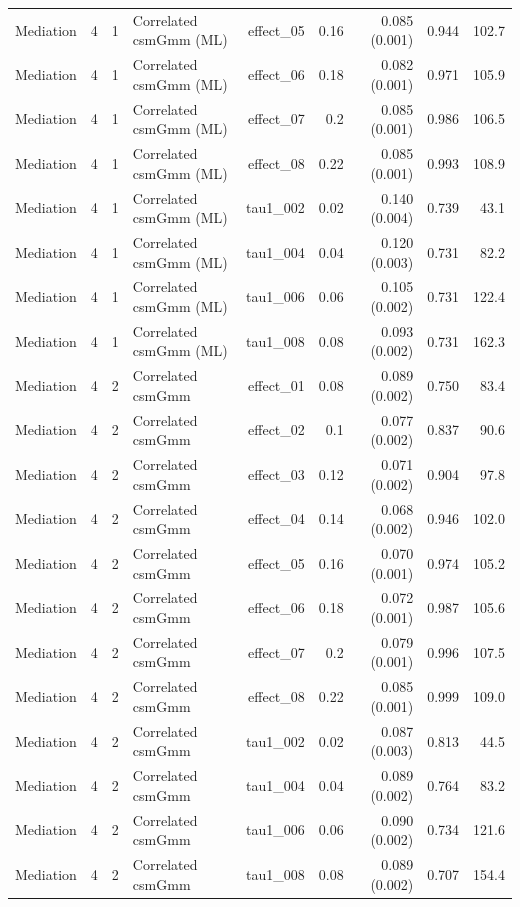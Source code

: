 \begin{longtable}{lcclrrrrr}
Mediation & 4 & 1 & Correlated csmGmm (ML) & effect\_05 & 0.16 & 0.085 (0.001) & 0.944 & 102.7\\
Mediation & 4 & 1 & Correlated csmGmm (ML) & effect\_06 & 0.18 & 0.082 (0.001) & 0.971 & 105.9\\
Mediation & 4 & 1 & Correlated csmGmm (ML) & effect\_07 & 0.2 & 0.085 (0.001) & 0.986 & 106.5\\
Mediation & 4 & 1 & Correlated csmGmm (ML) & effect\_08 & 0.22 & 0.085 (0.001) & 0.993 & 108.9\\
Mediation & 4 & 1 & Correlated csmGmm (ML) & tau1\_002 & 0.02 & 0.140 (0.004) & 0.739 & 43.1\\
Mediation & 4 & 1 & Correlated csmGmm (ML) & tau1\_004 & 0.04 & 0.120 (0.003) & 0.731 & 82.2\\
Mediation & 4 & 1 & Correlated csmGmm (ML) & tau1\_006 & 0.06 & 0.105 (0.002) & 0.731 & 122.4\\
Mediation & 4 & 1 & Correlated csmGmm (ML) & tau1\_008 & 0.08 & 0.093 (0.002) & 0.731 & 162.3\\
Mediation & 4 & 2 & Correlated csmGmm & effect\_01 & 0.08 & 0.089 (0.002) & 0.750 & 83.4\\
Mediation & 4 & 2 & Correlated csmGmm & effect\_02 & 0.1 & 0.077 (0.002) & 0.837 & 90.6\\
Mediation & 4 & 2 & Correlated csmGmm & effect\_03 & 0.12 & 0.071 (0.002) & 0.904 & 97.8\\
Mediation & 4 & 2 & Correlated csmGmm & effect\_04 & 0.14 & 0.068 (0.002) & 0.946 & 102.0\\
Mediation & 4 & 2 & Correlated csmGmm & effect\_05 & 0.16 & 0.070 (0.001) & 0.974 & 105.2\\
Mediation & 4 & 2 & Correlated csmGmm & effect\_06 & 0.18 & 0.072 (0.001) & 0.987 & 105.6\\
Mediation & 4 & 2 & Correlated csmGmm & effect\_07 & 0.2 & 0.079 (0.001) & 0.996 & 107.5\\
Mediation & 4 & 2 & Correlated csmGmm & effect\_08 & 0.22 & 0.085 (0.001) & 0.999 & 109.0\\
Mediation & 4 & 2 & Correlated csmGmm & tau1\_002 & 0.02 & 0.087 (0.003) & 0.813 & 44.5\\
Mediation & 4 & 2 & Correlated csmGmm & tau1\_004 & 0.04 & 0.089 (0.002) & 0.764 & 83.2\\
Mediation & 4 & 2 & Correlated csmGmm & tau1\_006 & 0.06 & 0.090 (0.002) & 0.734 & 121.6\\
Mediation & 4 & 2 & Correlated csmGmm & tau1\_008 & 0.08 & 0.089 (0.002) & 0.707 & 154.4\\

\end{longtable}
